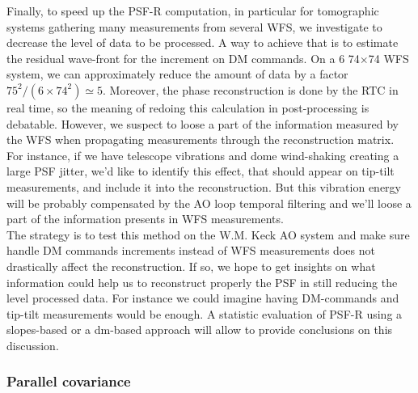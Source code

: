 \documentclass[12pt]{article}
\begin{document}
Finally, to speed up the PSF-R computation, in particular for tomographic systems gathering many measurements from several WFS, we investigate to decrease the level of data to be processed. A way to achieve that is to estimate the residual wave-front for the increment on DM commands. On a 6 74$\times$74 WFS system, we can approximately reduce the amount of data by a factor $75^2/(6\times74^2)\simeq 5$. Moreover, the phase reconstruction is done by the RTC in real time, so the meaning of redoing this calculation in post-processing is debatable. However, we suspect to loose a part of the information measured by the WFS when propagating measurements through the reconstruction matrix. For instance, if we have telescope vibrations and dome wind-shaking creating a large PSF jitter, we'd like to identify this effect, that should appear on tip-tilt measurements, and include it into the reconstruction. But this vibration energy will be probably compensated by the AO loop temporal filtering and we'll loose a part of the information presents in WFS measurements.\\

The strategy is to test this method on the W.M. Keck AO system and make sure handle DM commands increments instead of WFS measurements does not drastically affect the reconstruction. If so, we hope to get insights on what information could help us to reconstruct properly the PSF in still reducing the level processed data. For instance we could imagine having DM-commands and tip-tilt measurements would be enough. A statistic evaluation of PSF-R using a slopes-based or a dm-based approach will allow to provide conclusions on this discussion. 



\subsubsection{Parallel covariance}
\end{document}
